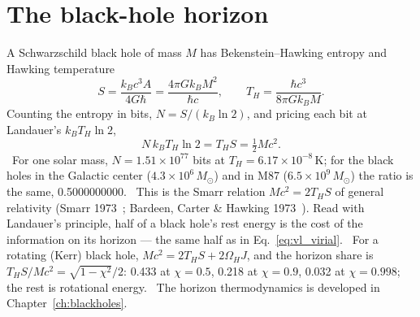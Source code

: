 \section{The black-hole horizon}\label{sec:vl_bh}
A Schwarzschild black hole of mass $M$ has Bekenstein--Hawking entropy and Hawking temperature~\cite{Bekenstein1973,Hawking1975}
\begin{equation}
S=\frac{k_Bc^3A}{4G\hbar}=\frac{4\pi Gk_BM^2}{\hbar c},\qquad T_H=\frac{\hbar c^3}{8\pi Gk_BM}.\label{eq:vl_bh}
\end{equation}
Counting the entropy in bits, $N=S/(k_B\ln2)$, and pricing each bit at Landauer's $k_BT_H\ln2$,
\begin{equation}
N\,k_BT_H\ln2=T_HS=\tfrac12Mc^2 .\label{eq:vl_smarr}
\end{equation}
\derived\ For one solar mass, $N=1.51\times10^{77}$ bits at $T_H=6.17\times10^{-8}$\,K; for the black holes in the Galactic center ($4.3\times10^6\,M_\odot$)
and in M87 ($6.5\times10^9\,M_\odot$) the ratio is the same, 0.5000000000. \calc\ This is the Smarr relation $Mc^2=2T_HS$ of general relativity (Smarr
1973~\cite{Smarr1973}; Bardeen, Carter \& Hawking 1973~\cite{BardeenCarterHawking1973}). Read with Landauer's principle, half of a black hole's rest energy
is the cost of the information on its horizon --- the same half as in Eq.~\eqref{eq:vl_virial}. \interp\ For a rotating (Kerr) black hole,
$Mc^2=2T_HS+2\Omega_HJ$, and the horizon share is $T_HS/Mc^2=\sqrt{1-\chi^2}/2$: 0.433 at $\chi=0.5$, 0.218 at $\chi=0.9$, 0.032 at $\chi=0.998$; the rest is
rotational energy. \calc\ The horizon thermodynamics is developed in Chapter~\ref{ch:blackholes}.


